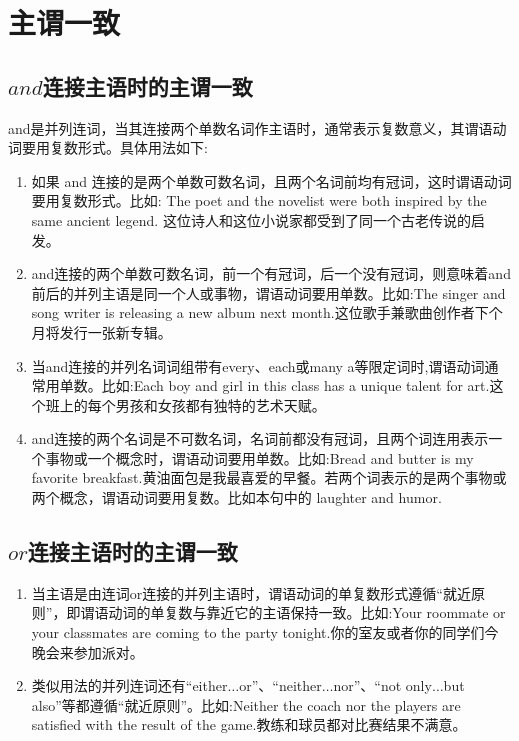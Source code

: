 

\section{主谓一致}

\subsection{\(and\)连接主语时的主谓一致}

and是并列连词，当其连接两个单数名词作主语时，通常表示复数意义，其谓语动词要用复数形式。具体用法如下:
\begin{enumerate}
  \item 如果 and 连接的是两个单数可数名词，且两个名词前均有冠词，这时谓语动词要用复数形式。比如: The poet and the novelist were both inspired by the same ancient legend. 这位诗人和这位小说家都受到了同一个古老传说的启发。
  \item and连接的两个单数可数名词，前一个有冠词，后一个没有冠词，则意味着and前后的并列主语是同一个人或事物，谓语动词要用单数。比如:The singer and song writer is releasing a new album next month.这位歌手兼歌曲创作者下个月将发行一张新专辑。
  \item 当and连接的并列名词词组带有every、each或many a等限定词时,谓语动词通常用单数。比如:Each boy and girl in this class has a unique talent for art.这个班上的每个男孩和女孩都有独特的艺术天赋。
  \item and连接的两个名词是不可数名词，名词前都没有冠词，且两个词连用表示一个事物或一个概念时，谓语动词要用单数。比如:Bread and butter is my favorite breakfast.黄油面包是我最喜爱的早餐。若两个词表示的是两个事物或两个概念，谓语动词要用复数。比如本句中的 laughter and humor.
\end{enumerate}

\subsection{\(or\)连接主语时的主谓一致}

\begin{enumerate}
  \item 当主语是由连词or连接的并列主语时，谓语动词的单复数形式遵循“就近原则”，即谓语动词的单复数与靠近它的主语保持一致。比如:Your roommate or your classmates are coming to the party tonight.你的室友或者你的同学们今晚会来参加派对。
  \item 类似用法的并列连词还有“either\(\ldots\)or”、“neither\(\ldots\)nor”、“not only\(\ldots\)but also”等都遵循“就近原则”。比如:Neither the coach nor the players are satisfied with the result of the game.教练和球员都对比赛结果不满意。
\end{enumerate}

